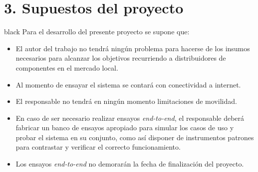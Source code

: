 \documentclass[11pt]{charter}
\begin{document}
\section{3. Supuestos del proyecto}
\label{sec:supuestos}
\begin{consigna}{black}
Para el desarrollo del presente proyecto se supone que:
\begin{itemize}
	\item El autor del trabajo no tendrá ningún problema para hacerse de los insumos necesarios para alcanzar los objetivos recurriendo a distribuidores de componentes en el mercado local.
	\item Al momento de ensayar el sistema se contará con conectividad a internet.
	\item El responsable no tendrá en ningún momento limitaciones de movilidad.
	\item En caso de ser necesario realizar ensayos \textit{end-to-end}, el responsable deberá fabricar un banco de ensayos apropiado para simular los casos de uso y probar el sistema en su conjunto, como así disponer de instrumentos patrones para contrastar y verificar el correcto funcionamiento.
	\item Los ensayos \textit{end-to-end} no demorarán la fecha de finalización del proyecto.
\end{itemize}
\end{consigna}
\end{document}
